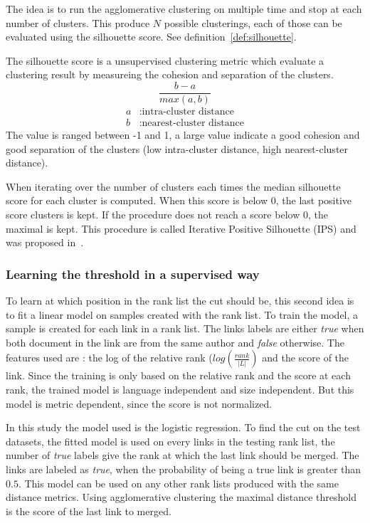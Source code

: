 The idea is to run the agglomerative clustering on multiple time and stop at each number of clusters.
This produce $N$ possible clusterings, each of those can be evaluated using the silhouette score.
See definition~\ref{def:silhouette}.

\begin{definition}
  \label{def:silhouette}
  The silhouette score is a unsupervised clustering metric which evaluate a clustering result by measureing the cohesion and separation of the clusters.
  \begin{equation}
    \frac{b - a}{max(a, b)}
  \end{equation}
  \begin{equation*}
    \begin{split}
      a&: \text{intra-cluster distance}\\
      b&: \text{nearest-cluster distance}
    \end{split}
  \end{equation*}
  The value is ranged between -1 and 1, a large value indicate a good cohesion and good separation of the clusters (low intra-cluster distance, high nearest-cluster distance).
\end{definition}

When iterating over the number of clusters each times the median silhouette score for each cluster is computed.
When this score is below 0, the last positive score clusters is kept.
If the procedure does not reach a score below 0, the maximal is kept.
This procedure is called Iterative Positive Silhouette (IPS) and was proposed in~\cite{automated_unsupervised}.

\subsubsection{Learning the threshold in a supervised way}

To learn at which position in the rank list the cut should be, this second idea is to fit a linear model on samples created with the rank list.
To train the model, a sample is created for each link in a rank list.
The links labels are either \textit{true} when both document in the link are from the same author and \textit{false} otherwise.
The features used are : the log of the relative rank ($log(\frac{rank}{|L|})$ and the score of the link.
Since the training is only based on the relative rank and the score at each rank, the trained model is language independent and size independent.
But this model is metric dependent, since the score is not normalized.

In this study the model used is the logistic regression.
To find the cut on the test datasets, the fitted model is used on every links in the testing rank list, the number of \textit{true} labels give the rank at which the last link should be merged.
The links are labeled as \textit{true}, when the probability of being a true link is greater than $0.5$.
This model can be used on any other rank lists produced with the same distance metrics.
Using agglomerative clustering the maximal distance threshold is the score of the last link to merged.
